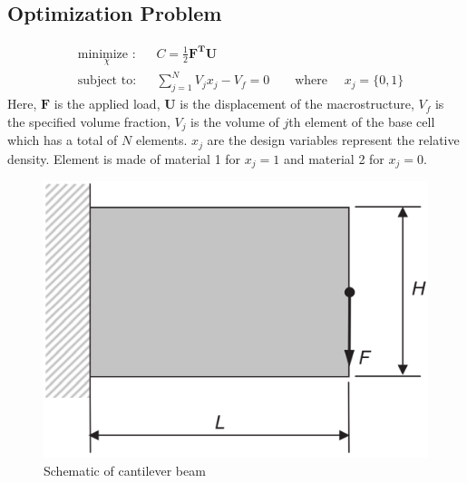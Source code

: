 \documentclass[10pt]{article}
\begin{document}
\subsection{Optimization Problem}
\begin{equation}
\label{eq:2dopt}
\begin{aligned}
& \underset{\chi}{\text{minimize :}}
& &  C = \frac{1}{2}\textbf{F}^\textbf{T}\textbf{U}\\
& \text{subject to:}
& & \sum_{j=1}^N V_j x_j - V_f = 0 \qquad \text{where }\quad x_j = \{0, 1\}
\end{aligned}
\end{equation}
Here, $\textbf{F}$ is the applied load, $\textbf{U}$ is the displacement of the macrostructure, $V_f$ is the specified volume fraction, $V_j$ is the volume of $j$th element of the base cell which has a total of $N$ elements. $x_j$ are the design variables represent the relative density. Element is made of material 1 for $x_j=1$ and material 2 for $x_j=0$. 
\cite{huang2013topology}
\begin{figure}[H]
\begin{center}
\includegraphics[scale=0.2]{./Plots/opti/cant.png}
\caption{Schematic of cantilever beam}
\label{fig:cantilever}
\end{center}
\end{figure}
\end{document}
